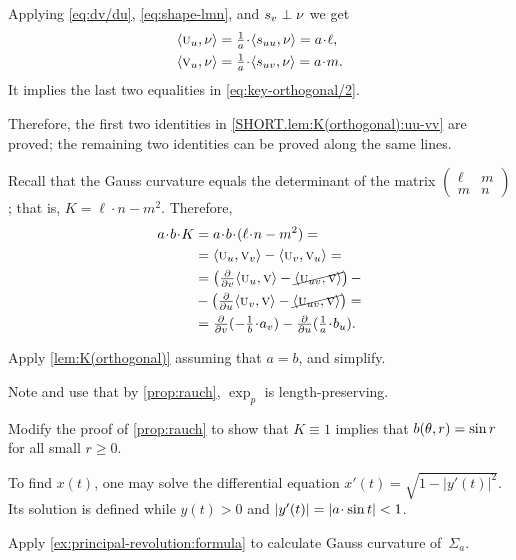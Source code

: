 \begin{multicols}{2}
Applying \ref{eq:dv/du}, \ref{eq:shape-lmn}, and $s_v\perp\nu$ we get
\begin{align*}
\langle\vec u_u,\Norm\rangle
&=
\tfrac1{a}\cdot \langle s_{uu},\Norm\rangle
=a\cdot \ell,
\\
\langle\vec v_u,\Norm\rangle
&=
\tfrac1{a}\cdot \langle s_{uv},\Norm\rangle
=a\cdot m.
\end{align*}
It implies the last two equalities in \ref{eq:key-orthogonal/2}.

Therefore, the first two identities in \ref{SHORT.lem:K(orthogonal):uu-vv} are proved;
the remaining two identities can be proved along the same lines.

Recall that the Gauss curvature equals the determinant of the matrix $
(\begin{smallmatrix}
\ell&m
\\
m&n
\end{smallmatrix}
)
$;
that is, $K=\ell\cdot n-m^2$.
Therefore, 
\begin{align*}
a\cdot b\cdot K
&=
a\cdot b\cdot(\ell\cdot n-m^2)
=
\\
&=
\langle\vec u_u,\vec v_v\rangle 
-
\langle\vec u_v,\vec v_u\rangle= 
\\
&= 
\left(
\tfrac{\partial}{\partial v}
\langle\vec u_u,\vec v\rangle
-
\cancel{\langle\vec u_{uv},\vec v\rangle}
\right)-
\\
&-
\left(
\tfrac{\partial}{\partial u}
\langle\vec u_v,\vec v\rangle
-
\cancel{\langle\vec u_{uv},\vec v\rangle}
\right)=
\\
&=\tfrac{\partial}{\partial v}(-\tfrac1{b}\cdot a_v)
-
\tfrac{\partial}{\partial u}(\tfrac1{a}\cdot b_u).
\end{align*}

Apply \ref{lem:K(orthogonal)} assuming that $a=b$, and simplify.

Note and use that by \ref{prop:rauch}, $\exp_p$ is length-preserving.

 Modify the proof of \ref{prop:rauch} to show that $K\equiv 1$ implies that $b(\theta,r)\z=\sin r$ for all small $r\ge 0$.



To find $x(t)$, one may solve the differential equation
$x'(t)=\sqrt{1-|y'(t)|^2}$.
Its solution is defined while $y(t)>0$ and $|y'(t)|\z=|a\cdot \sin t|<1$.

Apply \ref{ex:principal-revolution:formula} to calculate Gauss curvature of~$\Sigma_a$.


\end{multicols}
